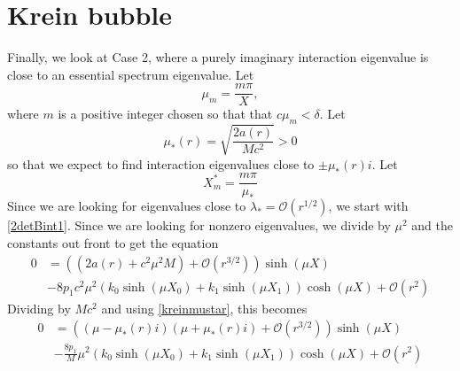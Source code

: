 \documentclass[thesis.tex]{subfiles}
\begin{document}
\section{Krein bubble}

Finally, we look at Case 2, where a purely imaginary interaction eigenvalue is close to an essential spectrum eigenvalue. Let
\[
\mu_m = \frac{m \pi}{X},
\]
where $m$ is a positive integer chosen so that that $c \mu_m < \delta$. Let 
\begin{equation}\label{kreinmustar}
\mu_*(r) = \sqrt{\frac{2 a(r)}{M c^2}} > 0
\end{equation}
so that we expect to find interaction eigenvalues close to $\pm \mu_*(r) i$. Let
\[
X_m^* = \frac{m \pi}{\mu_*}
\]
Since we are looking for eigenvalues close to $\lambda_* = \mathcal{O}(r^{1/2})$, we start with \cref{2detBint1}. Since we are looking for nonzero eigenvalues, we divide by $\mu^2$ and the constants out front to get the equation
\begin{equation}\label{KreinB1}
\begin{aligned}
0 &= \left( (2a(r) + c^2 \mu^2 M) +  \mathcal{O}( r^{3/2} )\right) \sinh(\mu X) \\
&-8 p_1 c^2 \mu^2 ( k_0\sinh(\mu X_0) + k_1 \sinh(\mu X_1) ) \cosh(\mu X) + \mathcal{O}( r^2 ) 
\end{aligned}
\end{equation}
Dividing by $M c^2$ and using \cref{kreinmustar}, this becomes
\begin{equation}\label{KreinB2}
\begin{aligned}
0 &= \left( (\mu - \mu_*(r) i)( \mu + \mu_*(r) i) +  \mathcal{O}( r^{3/2} )\right) \sinh(\mu X) \\
&-\frac{8 p_1}{M} \mu^2 ( k_0\sinh(\mu X_0) + k_1 \sinh(\mu X_1) ) \cosh(\mu X) + \mathcal{O}( r^2 ) 
\end{aligned}
\end{equation}
\end{document}
